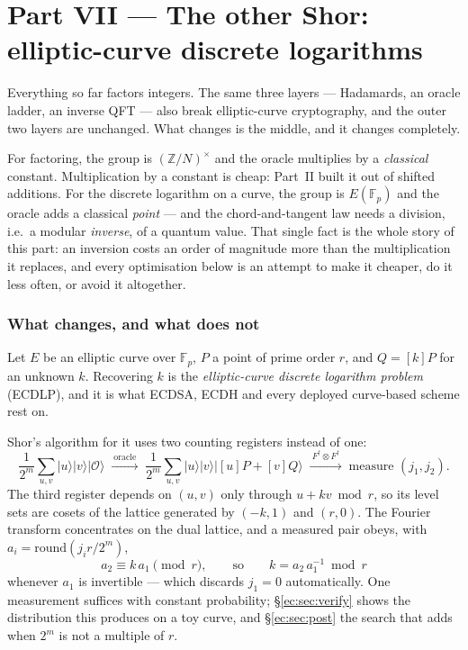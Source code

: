 \documentclass[11pt]{article}
\renewcommand{\ket}[1]{\lvert #1 \rangle}
\theoremstyle{plain}
\theoremstyle{remark}
\begin{document}
\clearpage
\part*{Part VII --- The other Shor: elliptic-curve discrete logarithms}

\begin{keybox}[title={Why a second half}]
Everything so far factors integers. The same three layers --- Hadamards, an oracle ladder, an
inverse QFT --- also break elliptic-curve cryptography, and the outer two layers are unchanged. What
changes is the middle, and it changes completely.

For factoring, the group is $(\mathbb{Z}/N)^\times$ and the oracle multiplies by a
\emph{classical} constant. Multiplication by a constant is cheap: Part~II built it out of shifted
additions. For the discrete logarithm on a curve, the group is $E(\mathbb{F}_p)$ and the oracle adds
a classical \emph{point} --- and the chord-and-tangent law needs a division, i.e.\ a modular
\emph{inverse}, of a quantum value. That single fact is the whole story of this part: an inversion
costs an order of magnitude more than the multiplication it replaces, and every optimisation below
is an attempt to make it cheaper, do it less often, or avoid it altogether.
\end{keybox}

\section{What changes, and what does not}\label{ec:sec:orient}

Let $E$ be an elliptic curve over $\mathbb{F}_p$, $P$ a point of prime order $r$, and
$Q=[k]P$ for an unknown $k$. Recovering $k$ is the \emph{elliptic-curve discrete logarithm problem}
(ECDLP), and it is what ECDSA, ECDH and every deployed curve-based scheme rest on.

Shor's algorithm for it \cite{ec:proos-zalka} uses two counting registers instead of one:
\[
\frac{1}{2^{m}}\sum_{u,v}\ket u\ket v\ket{\mathcal O}
\;\xrightarrow{\ \text{oracle}\ }\;
\frac{1}{2^{m}}\sum_{u,v}\ket u\ket v\ket{[u]P+[v]Q}
\;\xrightarrow{\ F^\dagger\otimes F^\dagger\ }\;
\text{measure } (j_1,j_2).
\]
The third register depends on $(u,v)$ only through $u+kv \bmod r$, so its level sets are cosets of
the lattice generated by $(-k,1)$ and $(r,0)$. The Fourier transform concentrates on the dual
lattice, and a measured pair obeys, with $a_i=\mathrm{round}(j_i r/2^{m})$,
\begin{equation}\label{ec:eq:post}
a_2 \equiv k\,a_1 \pmod r,
\qquad\text{so}\qquad
k = a_2\,a_1^{-1} \bmod r
\end{equation}
whenever $a_1$ is invertible --- which discards $j_1=0$ automatically. One measurement suffices with
constant probability; \S\ref{ec:sec:verify} shows the distribution this produces on a toy curve, and
\S\ref{ec:sec:post} the search that \cite{ec:ekera} adds when $2^m$ is not a multiple of $r$.
\end{document}
